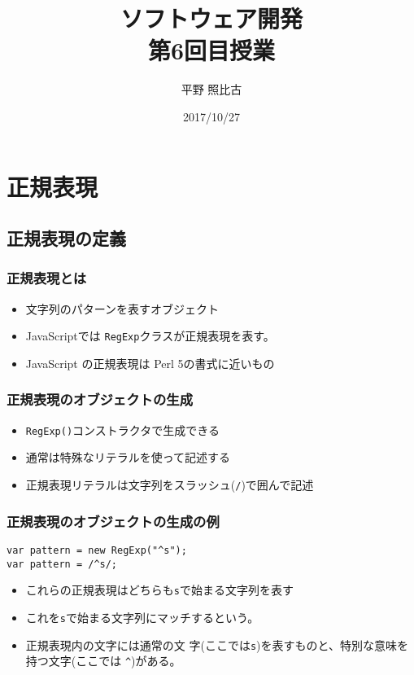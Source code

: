 %
%

\title{ソフトウェア開発\\第6回目授業}
\author{平野 照比古}
\institute{}
\date{2017/10/27}

\frame{\maketitle}
 \section{正規表現}
 \subsection{正規表現の定義}
\begin{frame}
 \frametitle{正規表現とは}
\begin{itemize}
 \item 文字列のパターンを表すオブジェクト
 \item JavaScriptでは
\texttt{RegExp}クラスが正規表現を表す。
 \item JavaScript の正規表現は Perl 5の書式に近いもの
\end{itemize}
\end{frame}
\begin{frame}
 \frametitle{正規表現のオブジェクトの生成}
\begin{itemize}
 \item \texttt{RegExp()}コンストラクタで生成できる
 \item 通常は特殊なリテラルを使って記述する
 \item 正規表現リテラルは文字列をスラッシュ(\texttt{/})で囲んで記述
\end{itemize}
\end{frame}
\begin{frame}[containsverbatim]
 \frametitle{正規表現のオブジェクトの生成の例}
\begin{Verbatim}
var pattern = new RegExp("^s");
var pattern = /^s/;
\end{Verbatim}
\begin{itemize}
 \item これらの正規表現はどちらも\texttt{s}で始まる文字列を表す
 \item これを\texttt{s}で始まる文字列にマッチするという。
 \item 正規表現内の文字には通常の文
字(ここでは\texttt{s})を表すものと、特別な意味を持つ文字(ここでは
\Verb+^+)がある。
\end{itemize}
\end{frame}
